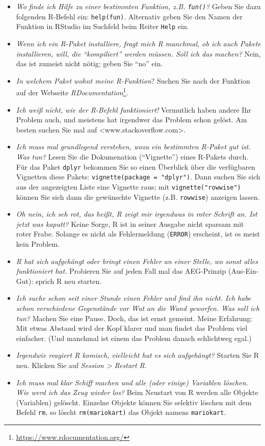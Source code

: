 \documentclass[
  letterpaper,
]{scrbook}
\providecommand{\tightlist}{%
  \setlength{\itemsep}{0pt}\setlength{\parskip}{0pt}}\usepackage{longtable,booktabs,array}
\theoremstyle{definition}
\theoremstyle{definition}
\theoremstyle{definition}
\theoremstyle{remark}
\begin{document}
\begin{itemize}
\tightlist
\item
  \emph{Wo finde ich Hilfe zu einer bestimmten Funktion, z.B.
  \texttt{fun()}?} Geben Sie dazu folgenden R-Befehl ein:
  \texttt{help(fun)}. Alternativ geben Sie den Namen der Funktion in
  RStudio im Suchfeld beim Reiter \texttt{Help} ein.
\item
  \emph{Wenn ich ein R-Paket installiere, fragt mich R manchmal, ob ich
  auch Pakete installieren, will, die \enquote{kompiliert} werden
  müssen. Soll ich das machen?} Nein, das ist zumeist nicht nötig; geben
  Sie \enquote{no} ein.
\item
  \emph{In welchem Paket wohnt meine R-Funktion}? Suchen Sie nach der
  Funktion auf der Webseite \emph{RDocumentation}\footnote{\url{https://www.rdocumentation.org/}}.
\item
  \emph{Ich weiß nicht, wie der R-Befehl funktioniert!} Vermutlich haben
  andere Ihr Problem auch, und meistens hat irgendwer das Problem schon
  gelöst. Am besten suchen Sie mal auf
  \textless www.stackoverflow.com\textgreater.
\item
  \emph{Ich muss mal grundlegend verstehen, wozu ein bestimmten R-Paket
  gut ist. Was tun?} Lesen Sie die Dokumenation (\enquote{Vignette})
  eines R-Pakets durch. Für das Paket \texttt{dplyr} bekommen Sie so
  einen Überblick über die verfügbaren Vignetten diese Pakets:
  \texttt{vignette(package\ =\ "dplyr")}. Dann suchen Sie sich aus der
  angezeigten Liste eine Vignette raus; mit \texttt{vignette("rowwise")}
  können Sie sich dann die gewünschte Vignette (z.B. \texttt{rowwise})
  anzeigen lassen.
\item
  \emph{Oh nein, ich seh rot, das heißt, R zeigt mir irgendwas in roter
  Schrift an. Ist jetzt was kaputt?} Keine Sorge, R ist in seiner
  Ausgabe nicht sparsam mit roter Frabe. Solange es nicht als
  Fehlermeldung (\texttt{ERROR}) erscheint, ist es meist kein Problem.
\item
  \emph{R hat sich aufgehängt oder bringt einen Fehler an einer Stelle,
  wo sonst alles funktioniert hat.} Probieren Sie auf jeden Fall mal das
  AEG-Prinzip (Aus-Ein-Gut): sprich R neu starten.
\item
  \emph{Ich suche schon seit einer Stunde einen Fehler und find ihn
  nicht. Ich habe schon verschiedene Gegenstände vor Wut an die Wand
  geworfen. Was soll ich tun?} Machen Sie eine Pause. Doch, das ist
  ernst gemeint. Meine Erfahrung: Mit etwas Abstand wird der Kopf klarer
  und man findet das Problem viel einfacher. (Und manchmal ist einem das
  Problem danach schlichtweg egal.)
\item
  \emph{Irgendwie reagiert R komisch, vielleicht hat es sich
  aufgehängt?} Starten Sie R neu. Klicken Sie auf \emph{Session
  \textgreater{} Restart R}.
\item
  \emph{Ich muss mal klar Schiff machen und alle (oder einige) Variablen
  löschen. Wie werd ich das Zeug wieder los?} Beim Neustart von R werden
  alle Objekte (Variablen) gelöscht. Einzelne Objekte können Sie
  selektiv löschen mit dem Befehl \texttt{rm}, so löscht
  \texttt{rm(mariokart)} das Objekt namens \texttt{mariokart}.
\end{itemize}
\end{document}
